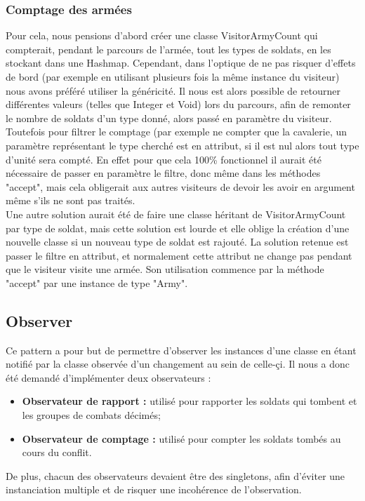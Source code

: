 \documentclass[12pt]{article}
\begin{document}
\subsubsection{Comptage des armées}
Pour cela, nous pensions d'abord créer une classe VisitorArmyCount qui compterait, 
pendant le parcours de l'armée, tout les types de soldats, en les stockant dans 
une Hashmap. Cependant, dans l'optique de ne pas risquer d'effets de bord (par 
exemple en utilisant plusieurs fois la même instance du visiteur) nous avons 
préféré utiliser la généricité. Il nous est alors possible de retourner 
différentes valeurs (telles que Integer et Void) lors du parcours, afin de 
remonter le nombre de soldats d'un type donné, alors passé en paramètre du 
visiteur. Toutefois pour filtrer le comptage (par exemple ne compter que la 
cavalerie, un paramètre représentant le type cherché est en attribut, si il est 
nul alors tout type d'unité sera compté. En effet pour que cela 100\% 
fonctionnel il aurait été nécessaire de passer en paramètre le filtre, donc même
dans les méthodes "accept", mais cela obligerait aux autres visiteurs de devoir les avoir
en argument même s'ils ne sont pas traités.\\
Une autre solution aurait été de faire une classe héritant de VisitorArmyCount par
type de soldat, mais cette solution est lourde et elle oblige la création d'une nouvelle
classe si un nouveau type de soldat est rajouté.
La solution retenue est passer le filtre en attribut, et normalement cette attribut ne 
change pas pendant que le visiteur visite une armée. 
Son utilisation commence par la méthode "accept" par une instance de type "Army".
\subsection{Observer}
Ce pattern a pour but de permettre d'observer les instances d'une classe en étant notifié par la classe observée d'un changement au sein de celle-çi. Il nous a donc été demandé d'implémenter deux observateurs :
\begin{itemize}
\item \textbf{Observateur de rapport :} utilisé pour rapporter les soldats qui tombent et les groupes de combats décimés; 
\item \textbf{Observateur de comptage :} utilisé pour compter les soldats tombés au cours du conflit. 
\end{itemize}
De plus, chacun des observateurs devaient être des singletons, afin d'éviter une instanciation multiple et de risquer une incohérence de l'observation.
\end{document}
